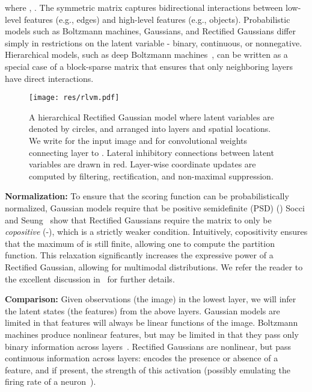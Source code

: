 \documentclass[10pt,twocolumn,letterpaper]{article}
\begin{document}
where , . The symmetric matrix  captures
bidirectional interactions between low-level features (e.g., edges)
and high-level features (e.g., objects). Probabilistic models such as
Boltzmann machines, Gaussians, and Rectified Gaussians differ simply
in restrictions on the latent variable - binary, continuous, or
nonnegative. Hierarchical models, such as deep Boltzmann
machines~\cite{salakhutdinov2009deep}, can be written as a special
case of a block-sparse matrix  that ensures that only neighboring
layers have direct interactions.

\begin{figure}[t!]
  \centering
  \texttt{[image: res/rlvm.pdf]}
\caption{A hierarchical Rectified Gaussian model where latent
    variables  are denoted by circles, and arranged into layers and
    spatial locations. We write  for the input image and  for
    convolutional weights connecting layer  to . Lateral
    inhibitory connections between latent variables are drawn in
    red. Layer-wise coordinate updates are computed by filtering,
    rectification, and non-maximal suppression.}
  \label{fig:rlvm}
\end{figure}

{\bf Normalization:} To ensure that the scoring function can be
probabilistically normalized, Gaussian models require that  be
positive semidefinite (PSD) () Socci and Seung~\cite{socci1998rectified} show that Rectified
Gaussians require the matrix  to only be {\em copositive}
(-), which is a strictly weaker
condition. Intuitively, copositivity ensures that the maximum of
 is still finite, allowing one to compute the partition
function. This relaxation significantly increases the expressive power
of a Rectified Gaussian, allowing for multimodal distributions. We
refer the reader to the excellent discussion
in~\cite{socci1998rectified} for further details.

{\bf Comparison:} Given observations (the image) in the lowest layer,
we will infer the latent states (the features) from the above
layers. Gaussian models are limited in that features will always be
linear functions of the image. Boltzmann machines produce nonlinear
features, but may be limited in that they pass only binary information
across layers~\cite{nair2010rectified}. Rectified Gaussians are
nonlinear, but pass continuous information across layers: 
encodes the presence or absence of a feature, and if present, the
strength of this activation (possibly emulating the firing rate of a
neuron~\cite{kandel2000principles}).
\end{document}
